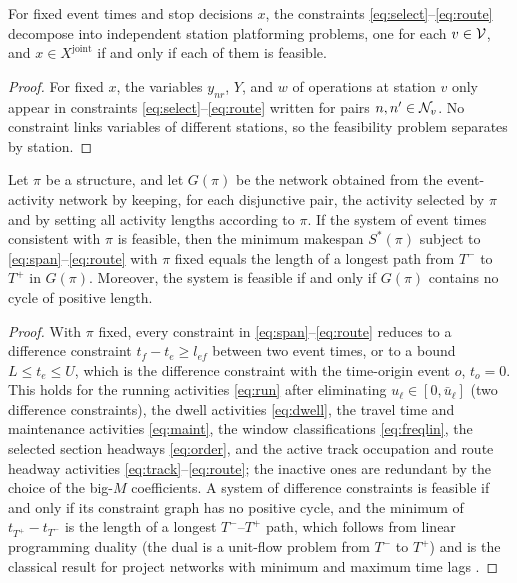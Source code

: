 \begin{proposition}\label{prop:decomp}
For fixed event times and stop decisions $x$, the constraints \eqref{eq:select}--\eqref{eq:route} decompose into independent station platforming problems, one for each $v\in\mathcal{V}$, and $x\in X^{\mathrm{joint}}$ if and only if each of them is feasible.
\end{proposition}
\begin{proof}
For fixed $x$, the variables $y_{nr}$, $Y$, and $w$ of operations at station $v$ only appear in constraints \eqref{eq:select}--\eqref{eq:route} written for pairs $n,n'\in\mathcal{N}_v$. No constraint links variables of different stations, so the feasibility problem separates by station.
\end{proof}

\begin{proposition}\label{prop:longest}
Let $\pi$ be a structure, and let $G(\pi)$ be the network obtained from the event-activity network by keeping, for each disjunctive pair, the activity selected by $\pi$ and by setting all activity lengths according to $\pi$. If the system of event times consistent with $\pi$ is feasible, then the minimum makespan $S^*(\pi)$ subject to \eqref{eq:span}--\eqref{eq:route} with $\pi$ fixed equals the length of a longest path from $T^-$ to $T^+$ in $G(\pi)$. Moreover, the system is feasible if and only if $G(\pi)$ contains no cycle of positive length.
\end{proposition}
\begin{proof}
With $\pi$ fixed, every constraint in \eqref{eq:span}--\eqref{eq:route} reduces to a difference constraint $t_f-t_e\ge l_{ef}$ between two event times, or to a bound $L\le t_e\le U$, which is the difference constraint with the time-origin event $o$, $t_o=0$. This holds for the running activities \eqref{eq:run} after eliminating $u_\ell\in[0,\bar u_\ell]$ (two difference constraints), the dwell activities \eqref{eq:dwell}, the travel time and maintenance activities \eqref{eq:maint}, the window classifications \eqref{eq:freqlin}, the selected section headways \eqref{eq:order}, and the active track occupation and route headway activities \eqref{eq:track}--\eqref{eq:route}; the inactive ones are redundant by the choice of the big-$M$ coefficients. A system of difference constraints is feasible if and only if its constraint graph has no positive cycle, and the minimum of $t_{T^+}-t_{T^-}$ is the length of a longest $T^-$--$T^+$ path, which follows from linear programming duality (the dual is a unit-flow problem from $T^-$ to $T^+$) and is the classical result for project networks with minimum and maximum time lags \citep{Bartusch1988}.
\end{proof}

